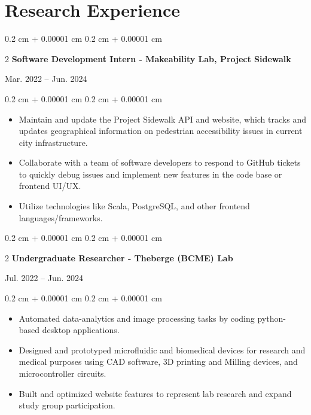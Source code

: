 \documentclass[10pt, letterpaper]{article}
\newenvironment{highlightsforbulletentries}{
    \begin{itemize}[
        topsep=0.10 cm,
        parsep=0.10 cm,
        partopsep=0pt,
        itemsep=0pt,
        leftmargin=10pt
    ]
}{
    \end{itemize}
} %
\newenvironment{onecolentry}{
    \begin{adjustwidth}{
        0.2 cm + 0.00001 cm
    }{
        0.2 cm + 0.00001 cm
    }
}{
    \end{adjustwidth}
} %
\newenvironment{twocolentry}[2][]{
    \onecolentry
    \def\secondColumn{#2}
    \setcolumnwidth{\fill, 4.5 cm}
    \begin{paracol}{2}
}{
    \switchcolumn \raggedleft \secondColumn
    \end{paracol}
    \endonecolentry
} %
\begin{document}
        \vspace{0.2 cm}

    \section{Research Experience}

        \begin{twocolentry}{
            Mar. 2022 – Jun. 2024
        }{
            \textbf{Software Development Intern - Makeability Lab, Project Sidewalk}
        }
        \end{twocolentry}
        \vspace{0.1 cm}
        \begin{onecolentry}
            \begin{highlightsforbulletentries}
                \item Maintain and update the Project Sidewalk API and website, which tracks and updates geographical
                information on pedestrian accessibility issues in current city infrastructure.
                \item Collaborate with a team of software developers to respond to GitHub tickets to quickly debug
                issues and implement new features in the code base or frontend UI/UX.
                \item Utilize technologies like Scala, PostgreSQL, and other frontend languages/frameworks.
            \end{highlightsforbulletentries}
        \end{onecolentry}

        \vspace{0.2 cm}

        \begin{twocolentry}{
            Jul. 2022 – Jun. 2024
        }{
            \textbf{Undergraduate Researcher - Theberge (BCME) Lab}
        }
        \end{twocolentry}
        \vspace{0.1 cm}
        \begin{onecolentry}
            \begin{highlightsforbulletentries}
                \item Automated data-analytics and image processing tasks by coding python-based desktop applications.
                \item Designed and prototyped microfluidic and biomedical devices for research and medical purposes
                using CAD software, 3D printing and Milling devices, and microcontroller circuits.
                \item Built and optimized website features to represent lab research and expand study group
                participation.
            \end{highlightsforbulletentries}
        \end{onecolentry}
\end{document}
